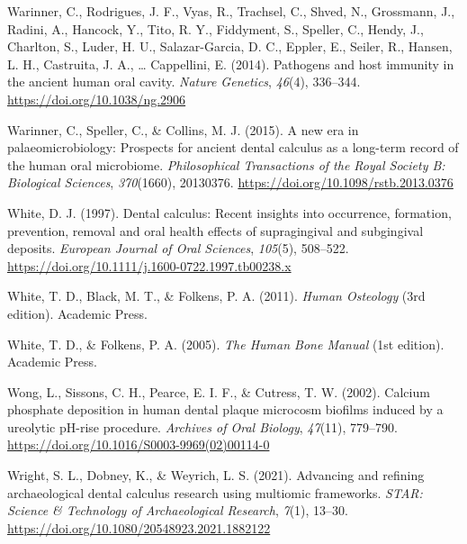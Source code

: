 \documentclass[
  letterpaper,
]{book}
\newlength{\cslhangindent}
\newlength{\cslentryspacingunit} %
\newenvironment{CSLReferences}[2] %
 {%
  \setlength{\parindent}{0pt}
  \ifodd #1
  \let\oldpar\par
  \def\par{\hangindent=\cslhangindent\oldpar}
  \fi
  \setlength{\parskip}{#2\cslentryspacingunit}
 }%
 {}
\begin{document}
\begin{CSLReferences}{1}{0}
\leavevmode{}%
Warinner, C., Rodrigues, J. F., Vyas, R., Trachsel, C., Shved, N.,
Grossmann, J., Radini, A., Hancock, Y., Tito, R. Y., Fiddyment, S.,
Speller, C., Hendy, J., Charlton, S., Luder, H. U., Salazar-Garcia, D.
C., Eppler, E., Seiler, R., Hansen, L. H., Castruita, J. A., \ldots{}
Cappellini, E. (2014). Pathogens and host immunity in the ancient human
oral cavity. \emph{Nature Genetics}, \emph{46}(4), 336--344.
\url{https://doi.org/10.1038/ng.2906}

\leavevmode{}%
Warinner, C., Speller, C., \& Collins, M. J. (2015). A new era in
palaeomicrobiology: Prospects for ancient dental calculus as a long-term
record of the human oral microbiome. \emph{Philosophical Transactions of
the Royal Society B: Biological Sciences}, \emph{370}(1660), 20130376.
\url{https://doi.org/10.1098/rstb.2013.0376}

\leavevmode{}%
White, D. J. (1997). Dental calculus: Recent insights into occurrence,
formation, prevention, removal and oral health effects of supragingival
and subgingival deposits. \emph{European Journal of Oral Sciences},
\emph{105}(5), 508--522.
\url{https://doi.org/10.1111/j.1600-0722.1997.tb00238.x}

\leavevmode{}%
White, T. D., Black, M. T., \& Folkens, P. A. (2011). \emph{Human
{Osteology}} (3rd edition). {Academic Press}.

\leavevmode{}%
White, T. D., \& Folkens, P. A. (2005). \emph{The {Human Bone Manual}}
(1st edition). {Academic Press}.

\leavevmode{}%
Wong, L., Sissons, C. H., Pearce, E. I. F., \& Cutress, T. W. (2002).
Calcium phosphate deposition in human dental plaque microcosm biofilms
induced by a ureolytic {pH-rise} procedure. \emph{Archives of Oral
Biology}, \emph{47}(11), 779--790.
\url{https://doi.org/10.1016/S0003-9969(02)00114-0}

\leavevmode{}%
Wright, S. L., Dobney, K., \& Weyrich, L. S. (2021). Advancing and
refining archaeological dental calculus research using multiomic
frameworks. \emph{STAR: Science \& Technology of Archaeological
Research}, \emph{7}(1), 13--30.
\url{https://doi.org/10.1080/20548923.2021.1882122}


\end{CSLReferences}
\end{document}
